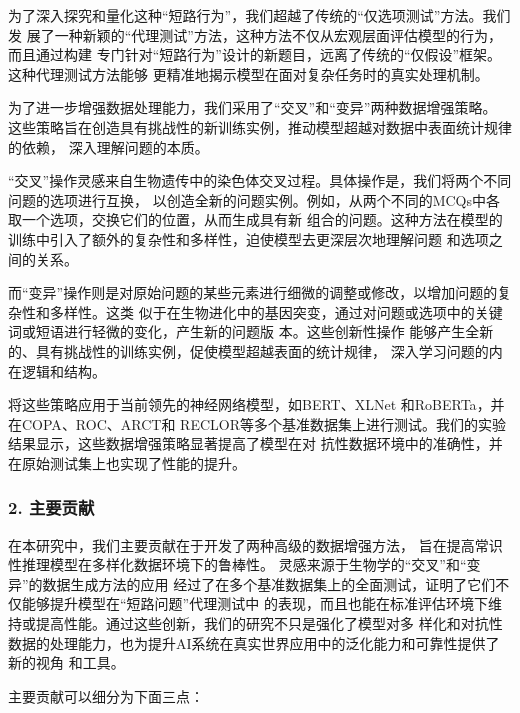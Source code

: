 为了深入探究和量化这种``短路行为''，我们超越了传统的``仅选项测试''方法。我们发
展了一种新颖的``代理测试''方法，这种方法不仅从宏观层面评估模型的行为，而且通过构建
专门针对``短路行为''设计的新题目，远离了传统的``仅假设''框架。这种代理测试方法能够
更精准地揭示模型在面对复杂任务时的真实处理机制。

为了进一步增强数据处理能力，我们采用了``交叉''和``变异''两种数据增强策略。
这些策略旨在创造具有挑战性的新训练实例，推动模型超越对数据中表面统计规律的依赖，
深入理解问题的本质。

``交叉''操作灵感来自生物遗传中的染色体交叉过程。具体操作是，我们将两个不同问题的选项进行互换，
以创造全新的问题实例。例如，从两个不同的MCQs中各取一个选项，交换它们的位置，从而生成具有新
组合的问题。这种方法在模型的训练中引入了额外的复杂性和多样性，迫使模型去更深层次地理解问题
和选项之间的关系。

而``变异''操作则是对原始问题的某些元素进行细微的调整或修改，以增加问题的复杂性和多样性。这类
似于在生物进化中的基因突变，通过对问题或选项中的关键词或短语进行轻微的变化，产生新的问题版
本。这些创新性操作
能够产生全新的、具有挑战性的训练实例，促使模型超越表面的统计规律，
深入学习问题的内在逻辑和结构。

将这些策略应用于当前领先的神经网络模型，如BERT\cite{devlin2018bert}、XLNet\cite{yang2019xlnet}
和RoBERTa\cite{liu2019roberta}，并在COPA\cite{roemmele2011choice}、ROC\cite{mostafazadeh2016corpus}、ARCT\cite{habernal2018argument}和
RECLOR\cite{yu2020reclor}等多个基准数据集上进行测试。我们的实验结果显示，这些数据增强策略显著提高了模型在对
抗性数据环境中的准确性，并在原始测试集上也实现了性能的提升。


\subsubsection*{2. 主要贡献}
在本研究中，我们主要贡献在于开发了两种高级的数据增强方法，
旨在提高常识性推理模型在多样化数据环境下的鲁棒性。
灵感来源于生物学的``交叉''和``变异''的数据生成方法的应用
经过了在多个基准数据集上的全面测试，证明了它们不仅能够提升模型在``短路问题''代理测试中
的表现，而且也能在标准评估环境下维持或提高性能。通过这些创新，我们的研究不只是强化了模型对多
样化和对抗性数据的处理能力，也为提升AI系统在真实世界应用中的泛化能力和可靠性提供了新的视角
和工具。

主要贡献可以细分为下面三点：

